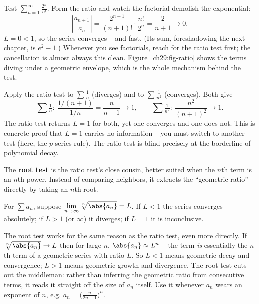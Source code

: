 \begin{example}
Test $\displaystyle\sum_{n=1}^\infty \frac{2^n}{n!}$. Form the ratio and watch the factorial demolish the exponential:
\[
\left|\frac{a_{n+1}}{a_n}\right| = \frac{2^{n+1}}{(n+1)!}\cdot\frac{n!}{2^n} = \frac{2}{n+1} \longrightarrow 0.
\]
$L = 0 < 1$, so the series converges -- and fast. (Its sum, foreshadowing the next chapter, is $e^2 - 1$.) Whenever you see factorials, reach for the ratio test first; the cancellation is almost always this clean. Figure~\ref{ch29:fig-ratio} shows the terms diving under a geometric envelope, which is the whole mechanism behind the test.
\end{example}

\begin{example}[Why $L=1$ is genuinely useless]
Apply the ratio test to $\sum \tfrac1n$ (diverges) and to $\sum \tfrac1{n^2}$ (converges). Both give
\[
\sum\tfrac1n:\ \frac{1/(n+1)}{1/n}=\frac{n}{n+1}\to 1, \qquad
\sum\tfrac1{n^2}:\ \frac{n^2}{(n+1)^2}\to 1.
\]
The ratio test returns $L=1$ for both, yet one converges and one does not. This is concrete proof that $L=1$ carries no information -- you must switch to another test (here, the $p$-series rule). The ratio test is blind precisely at the borderline of polynomial decay.
\end{example}

The \textbf{root test} is the ratio test's close cousin, better suited when the $n$th term is an $n$th power. Instead of comparing neighbors, it extracts the ``geometric ratio'' directly by taking an $n$th root.

\begin{theorem}
\label{ch29:thm-root}
For $\sum a_n$, suppose $\displaystyle\lim_{n\to\infty}\sqrt[n]{\abs{a_n}} = L$. If $L<1$ the series converges absolutely; if $L>1$ (or $\infty$) it diverges; if $L=1$ it is inconclusive.
\end{theorem}

\begin{whybox}
The root test works for the same reason as the ratio test, even more directly. If $\sqrt[n]{\abs{a_n}}\to L$ then for large $n$, $\abs{a_n}\approx L^n$ -- the term \emph{is} essentially the $n$th term of a geometric series with ratio $L$. So $L<1$ means geometric decay and convergence; $L>1$ means geometric growth and divergence. The root test cuts out the middleman: rather than inferring the geometric ratio from consecutive terms, it reads it straight off the size of $a_n$ itself. Use it whenever $a_n$ wears an exponent of $n$, e.g. $a_n = \big(\tfrac{n}{2n+1}\big)^n$.
\end{whybox}

